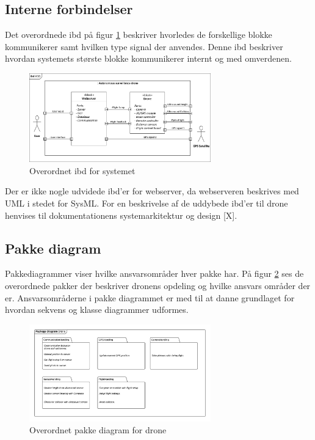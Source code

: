 \subsection{Interne forbindelser}

Det overordnede ibd på figur \ref{fig:ibd_asd} beskriver hvorledes de forskellige blokke kommunikerer samt hvilken type signal der anvendes.
Denne ibd beskriver hvordan systemets største blokke kommunikerer internt og med omverdenen. 

\begin{figure}[H]
	\centering
	\includegraphics[width=0.7\textwidth]{Billeder/Projektbeskrivelse/ibd1_overordnet.pdf}
	\caption{Overordnet ibd for systemet}
	\label{fig:ibd_asd}
\end{figure}

Der er ikke nogle udvidede ibd'er for webserver, da webserveren beskrives med UML i stedet for SysML. 
For en beskrivelse af de uddybede ibd'er til drone henvises til dokumentationens systemarkitektur og design [X].

\subsection{Pakke diagram}

Pakkediagrammer viser hvilke ansvarsområder hver pakke har.
På figur \ref{fig:package_drone} ses de overordnede pakker der beskriver dronens opdeling og hvilke ansvars områder der er.
Ansvarsområderne i pakke diagrammet er med til at danne grundlaget for hvordan sekvens og klasse diagrammer udformes.
 
\begin{figure}[H]
	\centering
	\includegraphics[width=0.7\textwidth]{Billeder/Projektbeskrivelse/Packagediagram_drone}
	\caption{Overordnet pakke diagram for drone}
	\label{fig:package_drone}
\end{figure}